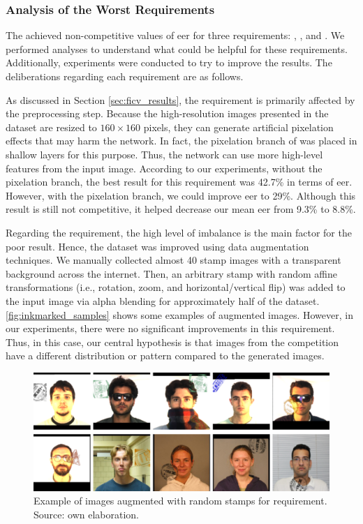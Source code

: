 
 
\subsubsection{Analysis of the Worst Requirements}
 
The \methodname achieved non-competitive values of \acs{eer} for three requirements: \inkmarked, \pixelation, and \otherfacesortoys. We performed analyses to understand what could be helpful for these requirements. Additionally, experiments were conducted to try to improve the results. The deliberations regarding each requirement are as follows.
 
As discussed in Section \ref{sec:ficv_results}, the \pixelation requirement is primarily affected by the preprocessing step. Because the high-resolution images presented in the dataset are resized to $160 \times 160$ pixels, they can generate artificial pixelation effects that may harm the network. In fact, the pixelation branch of \methodname was placed in shallow layers for this purpose. Thus, the network can use more high-level features from the input image. According to our experiments, without the pixelation branch, the best result for this requirement was 42.7\% in terms of \acs{eer}. However, with the pixelation branch, we could improve \acs{eer} to 29\%. Although this result is still not competitive, it helped decrease our mean \acs{eer} from 9.3\% to 8.8\%.
 
Regarding the \inkmarked requirement, the high level of imbalance is the main factor for the poor result. Hence, the dataset was improved using data augmentation techniques. We manually collected almost 40 stamp images with a transparent background across the internet. Then, an arbitrary stamp with random affine transformations (i.e., rotation, zoom, and horizontal/vertical flip) was added to the input image via alpha blending for approximately half of the dataset. \autoref{fig:inkmarked_samples} shows some examples of augmented images. However, in our experiments, there were no significant improvements in this requirement. Thus, in this case, our central hypothesis is that images from the competition have a different distribution or pattern compared to the generated images.
 
\begin{figure}[htb]
\centering
\includegraphics[width=\linewidth]{images/reqs/inkmarked/inkmarked_samples.pdf}
\caption{Example of images augmented with random stamps for \inkmarked requirement. Source: own elaboration.}
\label{fig:inkmarked_samples}
\end{figure}
 
